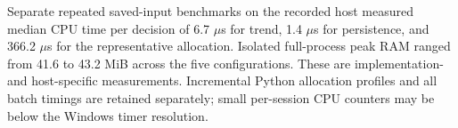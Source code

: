 \par Separate repeated saved-input benchmarks on the recorded host measured median CPU time per decision of 6.7 $\mu$s for trend, 1.4 $\mu$s for persistence, and 366.2 $\mu$s for the representative allocation. Isolated full-process peak RAM ranged from 41.6 to 43.2 MiB across the five configurations. These are implementation- and host-specific measurements. Incremental Python allocation profiles and all batch timings are retained separately; small per-session CPU counters may be below the Windows timer resolution.
